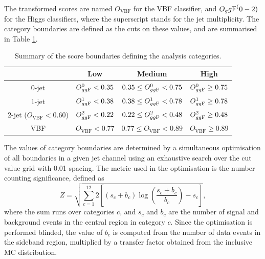 The transformed scores are named $O_\text{VBF}$ for the VBF classifier,
and $O_gg\text{F}^(0-2)$ for the Higgs classifiers, where the superscript
stands for the jet multiplicity. The category boundaries are defined
as the cuts on these values, and are summarised in Table \ref{tab:hmumu:categories}.
\begin{table}[h]
\centering
\caption{Summary of the score boundaries defining the analysis categories.}
\label{tab:hmumu:categories}
\begin{tabular}{c c c c}
\toprule
\midrule
                              & Low                   &  Medium                           &    High                  \\ 
\midrule
0-jet                         & $O^0_{gg\text{F}} < 0.35$   &  $0.35 \leq O^0_{gg\text{F}} < 0.75$    & $O^0_{gg\text{F}} \geq 0.75$   \\
1-jet                         & $O^1_{gg\text{F}} < 0.38$   &  $0.38 \leq O^1_{gg\text{F}} < 0.78$    & $O^1_{gg\text{F}} \geq 0.78$   \\
2-jet ($O_\text{VBF} < 0.60$) & $O^2_{gg\text{F}} < 0.22$   &  $0.22 \leq O^2_{gg\text{F}} < 0.48$    & $O^2_{gg\text{F}} \geq 0.48$   \\
VBF                           & $O_\text{VBF} < 0.77$ &  $0.77 \leq O_\text{VBF} < 0.89$  & $O_\text{VBF} \geq 0.89$ \\
\midrule
\bottomrule
\end{tabular}
\end{table}

The values of category boundaries are determined by a simultaneous
optimisation of all boundaries in a given jet channel using an exhaustive
search over the cut value grid with 0.01 spacing. The metric used in the
optimisation is the number counting significance, defined as
\begin{equation}
Z = \sqrt{\sum_{c=1}^{12} 2 \left[ (s_c + b_c) \log \left( \frac{s_c+b_c}{b_c}\right) - s_c \right]},
\end{equation}
where the sum runs over categories $c$, and $s_c$ and $b_c$ are the
number of signal and background events in the central region in category
$c$. Since the optimisation is performed blinded, the value of $b_c$ is
computed from the number of data events in the sideband region, multiplied
by a transfer factor obtained from the inclusive MC distribution.

